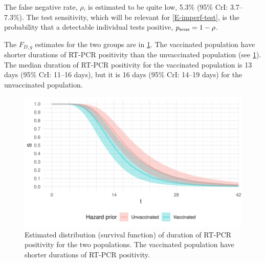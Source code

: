 \documentclass[thesis.tex]{subfiles}
\begin{document}
The false negative rate, $\rho$, is estimated to be quite low, 5.3\% (95\% CrI: 3.7--7.3\%).
The test sensitivity, which will be relevant for \cref{E-imperf-test}, is the probability that a detectable individual tests positive, $p_\text{sens} = 1 - \rho$.

The $F_{D,g}$ estimates for the two groups are in \cref{ATACCC:fig:duration}.
The vaccinated population have shorter durations of RT-PCR positivity than the unvaccinated population (see \cref{ATACCC:fig:duration}).
The median duration of RT-PCR positivity for the vaccinated population is 13 days (95\% CrI: 11--16 days), but it is 16 days (95\% CrI: 14--19 days) for the unvaccinated population.
\begin{figure}
  \centering \includegraphics{ATACCC/duration}
  \caption[Duration of RT-PCR positivity.]{Estimated distribution (survival function) of duration of RT-PCR positivity for the two populations. The vaccinated population have shorter durations of RT-PCR positivity.  \label{ATACCC:fig:duration}}
\end{figure}
\end{document}
